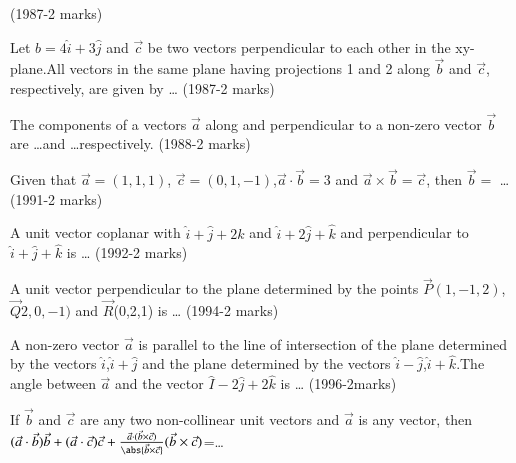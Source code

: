 \hfill{(1987-2 marks)}
\item Let $b=4\hat{i}+3\hat{j}$ and $\vec{c}$ be two vectors perpendicular to each other in the xy-plane.All vectors in the same plane having projections 1 and 2 along $\vec{b}$ and $\vec{c}$, respectively, are given by \dots
\hfill{(1987-2 marks)}
\item The components of a vectors $\vec{a}$ along and  perpendicular to a non-zero vector $\vec{b}$ are \dots and \dots respectively.
\hfill{(1988-2 marks)}
\item Given that $\vec{a}=(1,1,1)$, $\vec{c}=(0,1,-1)$,$\vec{a}\cdot\vec{b}=3$ and $\vec{a}\times\vec{b}=\vec{c}$, then $\vec{b}=$ \dots
\hfill{(1991-2 marks)}
\item A unit vector coplanar with $\hat{i}+\hat{j}+2\hat{k}$ and $\hat{i}+2\hat{j}+\hat{k}$ and perpendicular to $\hat{i}+\hat{j}+\hat{k}$ is \dots
\hfill{(1992-2 marks)}
\item A unit vector perpendicular to the plane determined by the points $\vec{P}$$(1,-1,2)$,$\vec{Q}2,0,-1)$ and $\vec{R}$(0,2,1) is \dots
\hfill{(1994-2 marks)}
\item A non-zero vector $\vec{a}$ is parallel to the line of intersection of the plane determined by the vectors $\hat{i}$,$\hat{i}+\hat{j}$ and the plane determined by the vectors $\hat{i}-\hat{j}$,$\hat{i}+\hat{k}$.The angle between $\vec{a}$ and the vector $\hat{I}-2\hat{j}+2\hat{k}$ is \dots
\hfill{(1996-2marks)}
\item If $\vec{b}$ and $\vec{c}$ are any two non-collinear unit vectors and $\vec{a}$ is any vector, then $(\vec{a}\cdot\vec{b})\vec{b}+(\vec{a}\cdot\vec{c})\vec{c}+\frac{\vec{a}\cdot(\vec{b}\times\vec{c})}{\abs{\vec{b}\times\vec{c}}}(\vec{b}\times\vec{c})$=\dots


